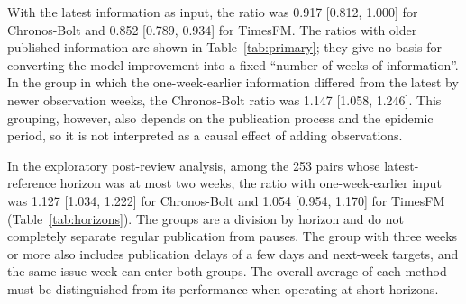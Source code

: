 \documentclass[11pt]{article}
\newcommand{\gentable}[1]{\adjustbox{max width=\linewidth}{}}
\begin{document}
With the latest information as input, the ratio was 0.917 [0.812, 1.000] for Chronos-Bolt and 0.852 [0.789, 0.934] for TimesFM. The ratios with older published information are shown in Table~\ref{tab:primary}; they give no basis for converting the model improvement into a fixed ``number of weeks of information''. In the group in which the one-week-earlier information differed from the latest by newer observation weeks, the Chronos-Bolt ratio was 1.147 [1.058, 1.246]. This grouping, however, also depends on the publication process and the epidemic period, so it is not interpreted as a causal effect of adding observations.

\begin{table}[tbp]\centering\small
\caption{WIS ratios by input relation when the one-week-earlier published information is used. These groups depend on the data-update process and are not randomly assigned conditions. The intervals of groups with few issue weeks, especially the identical-input group of TimesFM, are for reference only and are not taken to rest on enough independent epidemic episodes.}\label{tab:information}
\gentable{tab_information}
\end{table}

\begin{table}[tbp]\centering\small
\caption{Pre-planned breakdown by pathogen. For each method, pathogen and period, inputs from 0, 1 and 2 weeks earlier are compared with the latest fixed three-method ensemble on the same targets. For TimesFM, the full test period also includes only the period after its publication. Intervals are not adjusted for multiple comparisons, and the point estimates leaning towards a disadvantage for SARS-CoV-2 are not replaced by the average over all pathogens.}\label{tab:pathogens}
\gentable{tab_pathogens}
\end{table}

\begin{table}[tbp]\centering\small
\caption{Exploratory comparison by horizon, added after review. Each column takes the latest fixed three-method ensemble as 1. The horizon is the number of weeks from the observation end of the latest reference to the target week. Issue weeks can overlap between groups, so they are not added up.}\label{tab:horizons}
\gentable{tab_horizons}
\end{table}

In the exploratory post-review analysis, among the 253 pairs whose latest-reference horizon was at most two weeks, the ratio with one-week-earlier input was 1.127 [1.034, 1.222] for Chronos-Bolt and 1.054 [0.954, 1.170] for TimesFM (Table~\ref{tab:horizons}). The groups are a division by horizon and do not completely separate regular publication from pauses. The group with three weeks or more also includes publication delays of a few days and next-week targets, and the same issue week can enter both groups. The overall average of each method must be distinguished from its performance when operating at short horizons.
\end{document}
